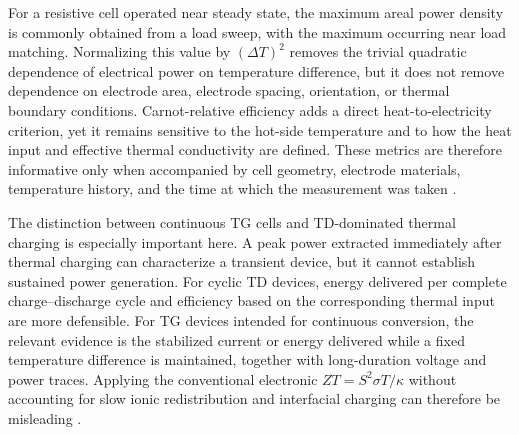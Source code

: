 For a resistive cell operated near steady state, the maximum areal power density
is commonly obtained from a load sweep, with the maximum occurring near load
matching. Normalizing this value by $(\Delta T)^2$ removes the trivial
quadratic dependence of electrical power on temperature difference, but it does
not remove dependence on electrode area, electrode spacing, orientation, or
thermal boundary conditions. Carnot-relative efficiency adds a direct
heat-to-electricity criterion, yet it remains sensitive to the hot-side
temperature and to how the heat input and effective thermal conductivity are
defined. These metrics are therefore informative only when accompanied by cell
geometry, electrode materials, temperature history, and the time at which the
measurement was taken \citep{duan2021liquid}.

The distinction between continuous TG cells and TD-dominated thermal charging
is especially important here. A peak power extracted immediately after thermal
charging can characterize a transient device, but it cannot establish sustained
power generation. For cyclic TD devices, energy delivered per complete
charge--discharge cycle and efficiency based on the corresponding thermal input
are more defensible. For TG devices intended for continuous conversion, the
relevant evidence is the stabilized current or energy delivered while a fixed
temperature difference is maintained, together with long-duration voltage and
power traces. Applying the conventional electronic
$ZT=S^2\sigma T/\kappa$ without accounting for slow ionic redistribution and
interfacial charging can therefore be misleading
\citep{jabeen2024recent,xu2026birdseye}.


